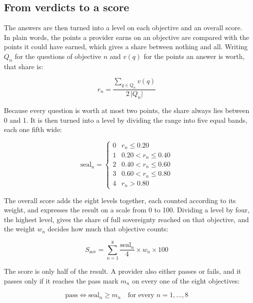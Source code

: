 \subsection*{From verdicts to a score}

The answers are then turned into a level on each objective and an overall score.
In plain words, the points a provider earns on an objective are compared with the
points it could have earned, which gives a share between nothing and all. Writing
$Q_n$ for the questions of objective $n$ and $v(q)$ for the points an answer is
worth, that share is:

\begin{equation}
  \label{eq:sov-share}
  r_n = \frac{\displaystyle\sum_{q \in Q_n} v(q)}{2\,\lvert Q_n \rvert}
\end{equation}

Because every question is worth at most two points, the share always lies between 0
and 1. It is then turned into a level by dividing the range into five equal bands,
each one fifth wide:

\begin{equation}
  \label{eq:sov-seal}
  \text{seal}_n =
  \begin{cases}
    0 & r_n \le 0.20\\
    1 & 0.20 < r_n \le 0.40\\
    2 & 0.40 < r_n \le 0.60\\
    3 & 0.60 < r_n \le 0.80\\
    4 & r_n > 0.80
  \end{cases}
\end{equation}

The overall score adds the eight levels together, each counted according to its
weight, and expresses the result on a scale from 0 to 100. Dividing a level by four,
the highest level, gives the share of full sovereignty reached on that objective,
and the weight $w_n$ decides how much that objective counts:

\begin{equation}
  \label{eq:sov-score}
  S_{\text{sov}} = \sum_{n=1}^{8} \frac{\text{seal}_n}{4} \times w_n \times 100
\end{equation}

The score is only half of the result. A provider also either passes or fails, and it
passes only if it reaches the pass mark $m_n$ on every one of the eight objectives:

\begin{equation}
  \label{eq:sov-pass}
  \text{pass} \iff \text{seal}_n \ge m_n \quad \text{for every } n = 1,\ldots,8
\end{equation}

